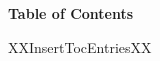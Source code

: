 \documentclass[12pt]{article}
\newcommand{\TocEntry}[3]{

\noindent
\begin{tabular}{p{4.9in} p{.3in}}
\textsc{#1} &  \mbox{} \hfill #3\\
\begin{tabular}{p{.3in} p{4.5in}} & \textit{#2} \end{tabular}\\
\end{tabular}\vspace{1em}}
\begin{document}

\begin{center}
{\selectfont \bfseries Table of Contents}
\end{center}

\vspace{1em}



XXInsertTocEntriesXX
\end{document}
